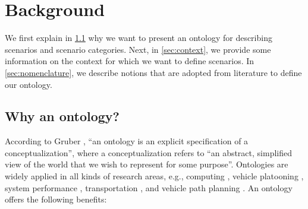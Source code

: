 \section{Background}
\label{sec:background}

We first explain in \cref{sec:why ontology} why we want to present an ontology for describing scenarios and  scenario categories. Next, in \cref{sec:context}, we provide some information on the context for which we want to define scenarios. In \cref{sec:nomenclature}, we describe notions that are adopted from literature to define our ontology.



\subsection{Why an ontology?}
\label{sec:why ontology}
According to Gruber \autocite{gruber1993ontology}, ``an ontology is an explicit specification of a conceptualization'', where a conceptualization refers to ``an abstract, simplified view of the world that we wish to represent for some purpose''. Ontologies are widely applied in all kinds of research areas, e.g., computing \autocite{chen2004soupa}, vehicle platooning \autocite{maiti2017conceptualization}, system performance \autocite{benvenuti2017ontologybased}, transportation \autocite{katsumi2018ontologies}, \cstart and vehicle path planning \autocite{provine2004ontology, schlenoff2003using}\cend. 
An ontology offers the following benefits:
